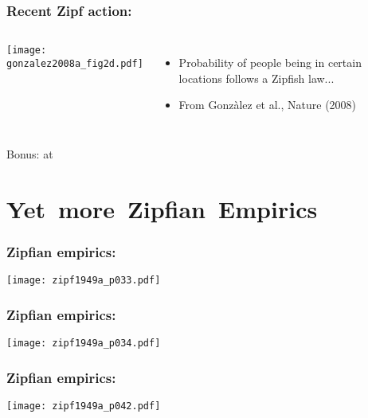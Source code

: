 \begin{frame}
  \frametitle{Recent Zipf action:}

  \begin{block}{}
  \begin{columns}
    \texttt{[image: gonzalez2008a\_fig2d.pdf]}
    \begin{itemize}
    \item 
      Probability of people being in certain locations
      follows a Zipfish law...
    \item 
      From Gonz\`{a}lez et al., Nature (2008)\\
      \cite{gonzalez2008a}
    \end{itemize}
  \end{columns}
  \end{block}

    Bonus: 
    at \newline


\end{frame}

\section{Yet\ more\ Zipfian\ Empirics}

\begin{frame}
  \frametitle{Zipfian empirics:}

    \centering
  \texttt{[image: zipf1949a\_p033.pdf]}

\end{frame}

\begin{frame}
  \frametitle{Zipfian empirics:}

    \centering
  \texttt{[image: zipf1949a\_p034.pdf]}

\end{frame}

\begin{frame}
  \frametitle{Zipfian empirics:}

    \centering
  \texttt{[image: zipf1949a\_p042.pdf]}

\end{frame}

